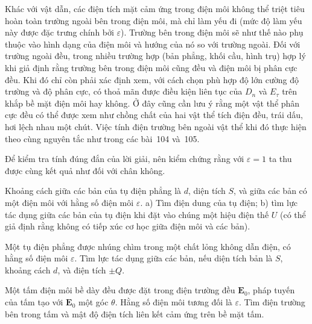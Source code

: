 Khác với vật dẫn, các điện tích mặt cảm ứng trong điện môi không thể triệt tiêu hoàn toàn trường ngoài bên trong điện môi, mà chỉ làm yếu đi (mức độ làm yếu này được đặc trưng chính bởi $\varepsilon$). Trường bên trong điện môi sẽ như thế nào phụ thuộc vào hình dạng của điện môi và hướng của nó so với trường ngoài. Đối với trường ngoài đều, trong nhiều trường hợp (bản phẳng, khối cầu, hình trụ) hợp lý khi giả định rằng trường bên trong điện môi cũng đều và điện môi bị phân cực đều. Khi đó chỉ còn phải xác định xem, với cách chọn phù hợp độ lớn cường độ trường và độ phân cực, có thoả mãn được điều kiện liên tục của $D_n$ và $E_\tau$ trên khắp bề mặt điện môi hay không. Ở đây cũng cần lưu ý rằng một vật thể phân cực đều có thể được xem như chồng chất của hai vật thể tích điện đều, trái dấu, hơi lệch nhau một chút. Việc tính điện trường bên ngoài vật thể khi đó thực hiện theo cùng nguyên tắc như trong các bài~104 và~105.

Để kiểm tra tính đúng đắn của lời giải, nên kiểm chứng rằng với $\varepsilon=1$ ta thu được cùng kết quả như đối với chân không.

 Khoảng cách giữa các bản của tụ điện phẳng là $d$, diện tích $S$, và giữa các bản có một điện môi với hằng số điện môi $\varepsilon$. a) Tìm điện dung của tụ điện; b) tìm lực tác dụng giữa các bản của tụ điện khi đặt vào chúng một hiệu điện thế $U$ (có thể giả định rằng không có tiếp xúc cơ học giữa điện môi và các bản).


 Một tụ điện phẳng được nhúng chìm trong một chất lỏng không dẫn điện, có hằng số điện môi $\varepsilon$. Tìm lực tác dụng giữa các bản, nếu diện tích bản là $S$, khoảng cách $d$, và điện tích $\pm Q$.


 Một tấm điện môi bề dày đều được đặt trong điện trường đều $\mathbf{E}_0$, pháp tuyến của tấm tạo với $\mathbf{E}_0$ một góc $\theta$. Hằng số điện môi tương đối là $\varepsilon$. Tìm điện trường bên trong tấm và mật độ điện tích liên kết cảm ứng trên bề mặt tấm.


